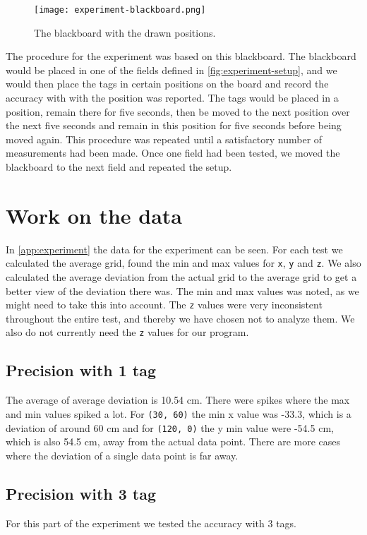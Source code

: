 \begin{figure}[H]
    \centering
    \texttt{[image: experiment-blackboard.png]}
    \caption{The blackboard with the drawn positions.}
    \label{fig:experiment-blackboard}
\end{figure}
\noindent
The procedure for the experiment was based on this blackboard.
The blackboard would be placed in one of the fields defined in \autoref{fig:experiment-setup}, and we would then place the tags in certain positions on the board and record the accuracy with with the position was reported.
The tags would be placed in a position, remain there for five seconds, then be moved to the next position over the next five seconds and remain in this position for five seconds before being moved again.
This procedure was repeated until a satisfactory number of measurements had been made.
Once one field had been tested, we moved the blackboard to the next field and repeated the setup.
 
\section{Work on the data}
In \autoref{app:experiment} the data for the experiment can be seen.
For each test we calculated the average grid, found the min and max values for \texttt{x}, \texttt{y} and \texttt{z}.
We also calculated the average deviation from the actual grid to the average grid to get a better view of the deviation there was.
The min and max values was noted, as we might need to take this into account. 
The \texttt{z} values were very inconsistent throughout the entire test, and thereby we have chosen not to analyze them.
We also do not currently need the \texttt{z} values for our program.

\subsection{Precision with 1 tag} 
The average of average deviation is 10.54 cm.
There were spikes where the max and min values spiked a lot.
For \texttt{(30, 60)} the min x value was -33.3, which is a deviation of around 60 cm and for \texttt{(120, 0)} the y min value were -54.5 cm, which is also 54.5 cm, away from the actual data point.
There are more cases where the deviation of a single data point is far away.

\subsection{Precision with 3 tag}
For this part of the experiment we tested the accuracy with 3 tags. 

